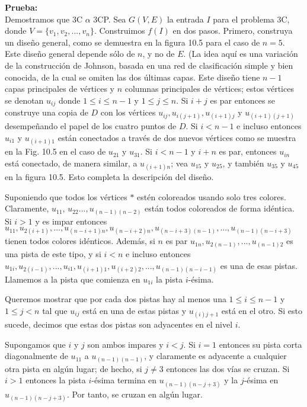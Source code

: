 \textbf{Prueba:}\\ 
Demostramos que 3C $\alpha$ 3CP. Sea $G(V, E)$ la entrada $I$ para el problema 3C, donde 
$V = \{v_{1}, v_{2}, ..., v_{n} \}$. Construimos $f(I)$ en dos pasos. Primero, construya un diseño general, 
como se demuestra en la figura 10.5 para el caso de $n = 5$. Este diseño general depende sólo de $n$, y no de $E$. 
(La idea aquí es una variación de la construcción de Johnson, basada en una red de clasificación simple y bien 
conocida, de la cual se omiten las dos últimas capas. 
Este diseño tiene $n - 1$ capas principales de vértices y $n$ columnas principales de vértices; estos vértices 
se denotan $u_{ij}$ donde $1 \leq i \leq n - 1$ y $1 \leq j \leq n$. Si $ i + j$ es par entonces se construye una 
copia de $D$ con los vértices $ u_{ij} , u_{i(j+1)}, u_{(i+1)j} $ y $ u_{( i+1)(j+1)} $ desempeñando el papel 
de los cuatro puntos de $D$. Si $i < n - 1$ e incluso entonces $u_{i1}$ y $u_{(i+1)1}$ están conectados a través 
de dos nuevos vértices como se muestra en la Fig. 10.5 en el caso de $u_{21} $ y $u_{31}$. Si $i < n - 1$ y $i + n$ 
es par, entonces $u_{in}$ está conectado, de manera similar, a $u_{(i+1)n}$; vea $u_{15}$ y $u_{25}$, y 
también $u_{35}$ y $u_{45}$ en la figura 10.5. Esto completa la descripción del diseño.

Suponiendo que todos los vértices $*$ estén coloreados usando solo tres colores. Claramente, 
$u_{11}$, $u_{22}. . . , u_{(n-1)(n-2)} $ están todos coloreados de forma idéntica. Si $i > 1$ y es impar entonces 
$u_{11}, u_{2(i+1)}, ... , u_{(n-i+1)n}, u_{(n-i+2) n}, u_{(n-i+3)(n-1)}, ..., u_{(n-1)(n-i+3)} $ tienen todos 
colores idénticos. Además, si $n$ es par $u_{1n}, u_{2(n-1)},. . . , u_{(n-1)2}$ es una pista de este tipo, y 
si $ i < n$ e incluso entonces $ u_{1i}, u_{2(i-1)},. . . , u_{i1}, u_{(i+1)1}, u_{(i+2)2}, . . . , u_{(n-1)(n-i-1)} $ 
es una de esas pistas. Llamemos a la pista que comienza en $u_{1i}$ la pista $i$-ésima.

Queremos mostrar que por cada dos pistas hay al menos una $1 \leq i \leq n - 1$ y $1 \leq j < n$ 
tal que $u_{ij}$ está en una de estas pistas y $u_{ (i)j+1}$ está en el otro. Si esto sucede, decimos que estas 
dos pistas son adyacentes en el nivel $i$.

Supongamos que $i$ y $j$ son ambos impares y $i <j$. Si $i = 1$ entonces su pista corta diagonalmente de 
$u_{11}$ a $u_{(n-1)(n-1)}$, y claramente es adyacente a cualquier otra pista en algún lugar; de hecho, 
si $j \neq 3$ entonces las dos vías se cruzan. Si $i > 1$ entonces la pista $i$-ésima termina en 
$u_{(n-1) (n-j+3)}$ y la $j$-ésima en $u_{(n-1) ( n-j+3)}$. Por tanto, se cruzan en algún lugar.


